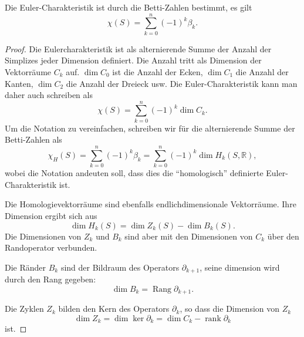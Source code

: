 \begin{satz}
Die Euler-Charakteristik ist durch die Betti-Zahlen bestimmt,
es gilt
\[
\chi(S)
=
\sum_{k=0}^n (-1)^k \beta_k.
\]
\end{satz}

\begin{proof}
Die Eulercharakteristik ist als alternierende Summe der Anzahl der Simplizes 
jeder Dimension definiert.
Die Anzahl tritt als Dimension der Vektorräume $C_k$ auf.
$\dim C_0$ ist die Anzahl der Ecken, $\dim C_1$ die Anzahl der Kanten,
$\dim C_2$ die Anzahl der Dreieck usw.
Die Euler-Charakteristik kann man daher auch schreiben als
\[
\chi(S)
=
\sum_{k=0}^n (-1)^k \dim C_k.
\]
Um die Notation zu vereinfachen, schreiben wir für die alternierende
Summe der Betti-Zahlen als
\[
\chi_H(S)
=
\sum_{k=0}^n
(-1)^k \beta_k
=
\sum_{k=0}^n
(-1)^k \dim H_k(S,\mathbb{R}),
\]
wobei die Notation andeuten soll, dass dies die ``homologisch''
definierte Euler-Charakteristik ist.

Die Homologievektorräume sind ebenfalls endlichdimensionale Vektorräume.
Ihre Dimension ergibt sich aus
\[
\dim H_k(S)
=
\dim Z_k(S) - \dim B_k(S).
\]
Die Dimensionen von $Z_k$ und $B_k$ sind aber mit den Dimensionen von
$C_k$ über den Randoperator verbunden.

Die Ränder $B_k$ sind der Bildraum des Operators $\partial_{k+1}$, seine
dimension wird durch den Rang gegeben:
\begin{equation}
\dim B_k
= 
\operatorname{Rang} \partial_{k+1}.
\label{buch:topologie:simplex:eqn:dimb}
\end{equation}

Die Zyklen $Z_k$ bilden den Kern des Operators $\partial_k$, so dass
die Dimension von $Z_k$
\begin{equation}
\dim Z_k
=
\dim\ker \partial_k
=
\dim C_k - \operatorname{rank} \partial_k
\label{buch:topologie:simplex:eqn:dimz}
\end{equation}
ist.


\end{proof}
